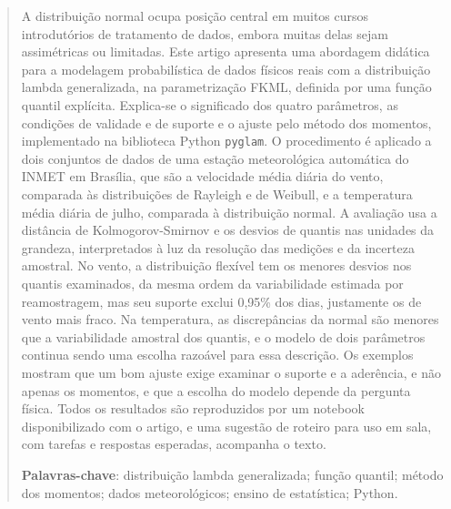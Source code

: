 \begin{abstract}
A distribuição normal ocupa posição central em muitos cursos introdutórios de tratamento de dados, embora muitas delas sejam assimétricas ou limitadas. Este artigo apresenta uma abordagem didática para a modelagem probabilística de dados físicos reais com a distribuição lambda generalizada, na parametrização FKML, definida por uma função quantil explícita. Explica-se o significado dos quatro parâmetros, as condições de validade e de suporte e o ajuste pelo método dos momentos, implementado na biblioteca Python \texttt{pyglam}. O procedimento é aplicado a dois conjuntos de dados de uma estação meteorológica automática do INMET em Brasília, que são a velocidade média diária do vento, comparada às distribuições de Rayleigh e de Weibull, e a temperatura média diária de julho, comparada à distribuição normal. A avaliação usa a distância de Kolmogorov-Smirnov e os desvios de quantis nas unidades da grandeza, interpretados à luz da resolução das medições e da incerteza amostral. No vento, a distribuição flexível tem os menores desvios nos quantis examinados, da mesma ordem da variabilidade estimada por reamostragem, mas seu suporte exclui 0,95\% dos dias, justamente os de vento mais fraco. Na temperatura, as discrepâncias da normal são menores que a variabilidade amostral dos quantis, e o modelo de dois parâmetros continua sendo uma escolha razoável para essa descrição. Os exemplos mostram que um bom ajuste exige examinar o suporte e a aderência, e não apenas os momentos, e que a escolha do modelo depende da pergunta física. Todos os resultados são reproduzidos por um notebook disponibilizado com o artigo, e uma sugestão de roteiro para uso em sala, com tarefas e respostas esperadas, acompanha o texto.

\medskip
\noindent\textbf{Palavras-chave}: distribuição lambda generalizada; função quantil; método dos momentos; dados meteorológicos; ensino de estatística; Python.
\end{abstract}

